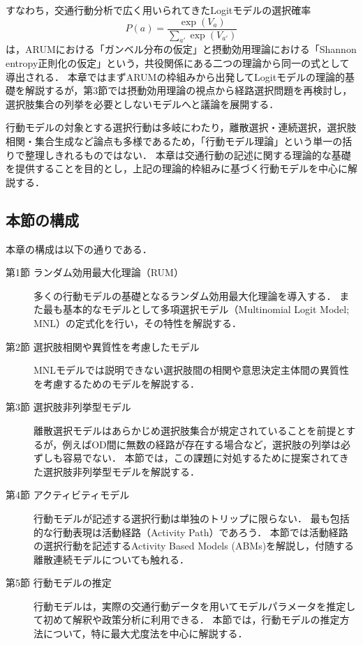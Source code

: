 すなわち，交通行動分析で広く用いられてきたLogitモデルの選択確率
\begin{equation*}\label{eq:logti_choice_model}
  P(a) = \frac{\exp(V_a)}{\sum_{a'}\exp(V_{a'})}
\end{equation*}
は，ARUMにおける「ガンベル分布の仮定」と摂動効用理論における「Shannon entropy正則化の仮定」という，共役関係にある二つの理論から同一の式として導出される．
本章ではまずARUMの枠組みから出発してLogitモデルの理論的基礎を解説するが，第3節では摂動効用理論の視点から経路選択問題を再検討し，選択肢集合の列挙を必要としないモデルへと議論を展開する．

行動モデルの対象とする選択行動は多岐にわたり，離散選択・連続選択，選択肢相関・集合生成など論点も多様であるため，「行動モデル理論」という単一の括りで整理しきれるものではない．
本章は交通行動の記述に関する理論的な基礎を提供することを目的とし，上記の理論的枠組みに基づく行動モデルを中心に解説する．

\subsection*{本節の構成}

本章の構成は以下の通りである．
\begin{description}
  \item[第1節 ランダム効用最大化理論（RUM）]
   多くの行動モデルの基礎となるランダム効用最大化理論を導入する．
   また最も基本的なモデルとして多項選択モデル（Multinomial Logit Model; MNL）の定式化を行い，その特性を解説する．

  \item[第2節 選択肢相関や異質性を考慮したモデル] 
  MNLモデルでは説明できない選択肢間の相関や意思決定主体間の異質性を考慮するためのモデルを解説する．

  \item[第3節 選択肢非列挙型モデル]
  離散選択モデルはあらかじめ選択肢集合が規定されていることを前提とするが，例えばOD間に無数の経路が存在する場合など，選択肢の列挙は必ずしも容易でない．
  本節では，この課題に対処するために提案されてきた選択肢非列挙型モデルを解説する．
  
  \item[第4節 アクティビティモデル]
  行動モデルが記述する選択行動は単独のトリップに限らない．
  最も包括的な行動表現は活動経路（Activity Path）であろう．
  本節では活動経路の選択行動を記述するActivity Based Models (ABMs)を解説し，付随する離散連続モデルについても触れる．
  
  \item [第5節 行動モデルの推定]
  行動モデルは，実際の交通行動データを用いてモデルパラメータを推定して初めて解釈や政策分析に利用できる．
  本節では，行動モデルの推定方法について，特に最大尤度法を中心に解説する．
\end{description}
